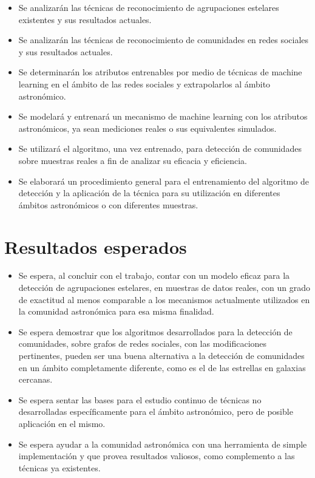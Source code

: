 \documentclass[
	11pt,oneside,a4paper,
	headsepline,footsepline,
	fleqn,
]{memoir}
\begin{document}
\begin{itemize}
	\item Se analizarán las técnicas de reconocimiento de agrupaciones estelares existentes y sus resultados actuales.
	\item Se analizarán las técnicas de reconocimiento de comunidades en redes sociales y sus resultados actuales.
	\item Se determinarán los atributos entrenables por medio de técnicas de machine learning en el ámbito de las redes sociales y extrapolarlos al ámbito astronómico.
	\item Se modelará y entrenará un mecanismo de machine learning con los atributos astronómicos, ya sean mediciones reales o sus equivalentes simulados.
	\item Se utilizará el algoritmo, una vez entrenado, para detección de comunidades sobre muestras reales a fin de analizar su eficacia y eficiencia.
	\item Se elaborará un procedimiento general para el entrenamiento del algoritmo de detección y la aplicación de la técnica para su utilización en diferentes ámbitos astronómicos o con diferentes muestras.
\end{itemize}



\section{Resultados esperados}

\begin{itemize}
	\item Se espera, al concluir con el trabajo, contar con un modelo eficaz para la detección de agrupaciones estelares, en muestras de datos reales, con un grado de exactitud al menos comparable a los mecanismos actualmente utilizados en la comunidad astronómica para esa misma finalidad.
	\item Se espera demostrar que los algoritmos desarrollados para la detección de comunidades, sobre grafos de redes sociales, con las modificaciones pertinentes, pueden ser una buena alternativa a la detección de comunidades en un ámbito completamente diferente, como es el de las estrellas en galaxias cercanas.
	\item Se espera sentar las bases para el estudio continuo de técnicas no desarrolladas específicamente para el ámbito astronómico, pero de posible aplicación en el mismo.
	\item Se espera ayudar a la comunidad astronómica con una herramienta de simple implementación y que provea resultados valiosos, como complemento a las técnicas ya existentes.
\end{itemize}
\end{document}
